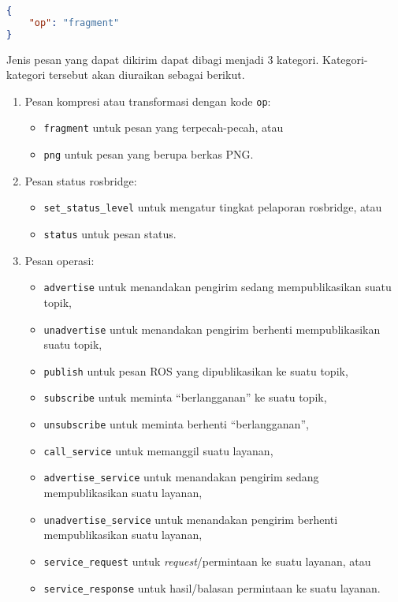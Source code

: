 \begin{lstlisting}[language=JSON, caption=contoh pesan valid pada lapisan transpor rosbridge]
{
    "op": "fragment"
}
\end{lstlisting}

Jenis pesan yang dapat dikirim dapat dibagi menjadi 3 kategori.
Kategori-kategori tersebut akan diuraikan sebagai berikut.
\begin{enumerate}
      \item Pesan kompresi atau transformasi dengan kode \texttt{op}:
            \begin{itemize}
                  \item \texttt{fragment} untuk pesan yang terpecah-pecah, atau
                  \item \texttt{png} untuk pesan yang berupa berkas PNG.
            \end{itemize}
      \item Pesan status rosbridge:
            \begin{itemize}
                  \item \texttt{set\_status\_level} untuk mengatur tingkat pelaporan
                        rosbridge, atau
                  \item \texttt{status} untuk pesan status.
            \end{itemize}
      \item Pesan operasi:
            \begin{itemize}
                  \item \texttt{advertise} untuk menandakan pengirim sedang
                        mempublikasikan suatu topik,
                  \item \texttt{unadvertise} untuk menandakan pengirim berhenti
                        mempublikasikan suatu topik,
                  \item \texttt{publish} untuk pesan ROS yang dipublikasikan ke
                        suatu topik,
                  \item \texttt{subscribe} untuk meminta ``berlangganan'' ke suatu
                        topik,
                  \item \texttt{unsubscribe} untuk meminta berhenti ``berlangganan'',
                  \item \texttt{call\_service} untuk memanggil suatu layanan,
                  \item \texttt{advertise\_service} untuk menandakan pengirim sedang
                        mempublikasikan suatu layanan, \item \texttt{unadvertise\_service}
                        untuk menandakan pengirim berhenti mempublikasikan suatu layanan,
                  \item \texttt{service\_request} untuk \textit{request}/permintaan
                        ke suatu layanan, atau \item \texttt{service\_response} untuk
                        hasil/balasan permintaan ke suatu layanan.
            \end{itemize}
\end{enumerate}

